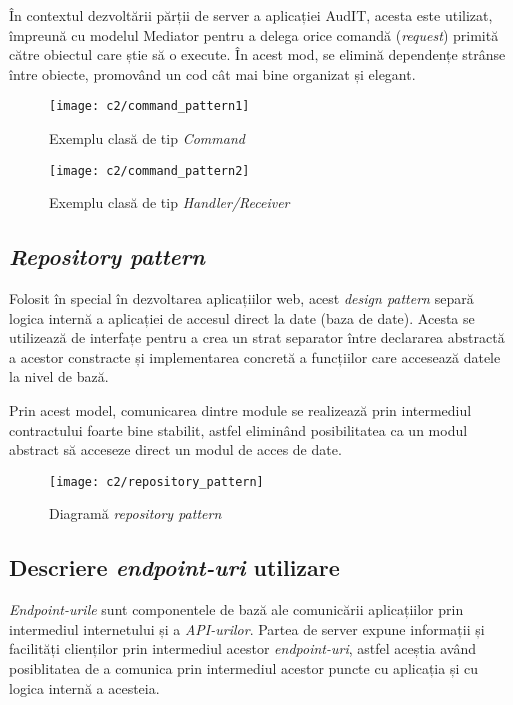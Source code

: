 În contextul dezvoltării părții de server a aplicației AudIT, acesta este utilizat, împreună cu modelul Mediator pentru a delega orice comandă (\textit{request}) primită către obiectul care știe să o execute. În acest mod, se elimină dependențe strânse între obiecte, promovând un cod cât mai bine organizat și elegant.\\

\vspace{1cm}
\begin{figure}[h]
	\centering
	
	\texttt{[image: c2/command\_pattern1]}
	\caption{Exemplu clasă de tip \textit{Command}}
\end{figure}



\vspace{1cm}
\begin{figure}[h]
	\centering
	
	\texttt{[image: c2/command\_pattern2]}
	\caption{Exemplu clasă de tip \textit{Handler/Receiver}}
\end{figure}


\subsection*{\textit{Repository pattern}}

Folosit în special în dezvoltarea aplicațiilor web, acest \textit{design pattern} separă logica internă a aplicației de accesul direct la date (baza de date). Acesta se utilizează de interfațe pentru a crea un strat separator între declararea abstractă a acestor constracte și implementarea concretă a funcțiilor care accesează datele la nivel de bază.

Prin acest model, comunicarea dintre module se realizează prin intermediul contractului foarte bine stabilit, astfel eliminând posibilitatea ca un modul abstract să acceseze direct un modul de acces de date.\\


\vspace{1cm}
\begin{figure}[h]
	\centering
	
	\texttt{[image: c2/repository\_pattern]}
	\caption{Diagramă \textit{repository pattern}}
\end{figure}

\subsection*{Descriere \textit{endpoint-uri} utilizare}
\textit{Endpoint-urile} sunt componentele de bază ale comunicării aplicațiilor prin intermediul internetului și a \textit{API-urilor}. Partea de server expune informații și facilități clienților prin intermediul acestor \textit{endpoint-uri}, astfel aceștia având posiblitatea de a comunica prin intermediul acestor puncte cu aplicația și cu logica internă a acesteia.


